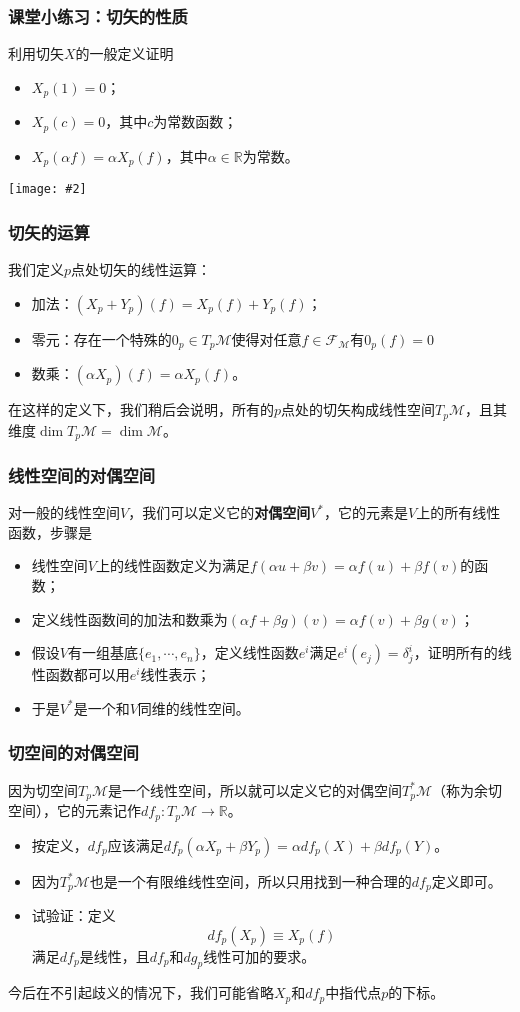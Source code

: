 \documentclass[CJK]{beamer}
\newcommand{\field}{\mathscr{F}}
\newcommand{\reals}{\mathbb{R}}
\newcommand{\mani}{\mathcal{M}}
\newcommand{\cpic}[2]{
\begin{center}
\texttt{[image: \#2]}
\end{center}
}
\begin{document}
\begin{frame}
\frametitle{\bch 课堂小练习：切矢的性质 \ech}
\bch
利用切矢$X$的一般定义证明
\begin{itemize}
\item $X_p(1) = 0$；
\item $X_p(c) = 0$，其中$c$为常数函数；
\item $X_p(\alpha f) = \alpha X_p(f)$，其中$\alpha \in \reals$为常数。
\end{itemize}
\cpic{0.2}{sad}

\ech
\end{frame}

\begin{frame}
\frametitle{\bch 切矢的运算 \ech}
\bch
我们定义$p$点处切矢的线性运算：
\begin{itemize}
\item 加法：$(X_p+Y_p)(f) = X_p(f) + Y_p(f)$；
\item 零元：存在一个特殊的$0_p\in T_p\mani$使得对任意$f\in \field_\mani$有$0_p (f) = 0$
\item 数乘：$(\alpha X_p)( f) = \alpha X_p(f)$。
\end{itemize}
在这样的定义下，我们稍后会说明，所有的$p$点处的切矢构成线性空间$T_p \mani$，且其维度$\dim T_p \mani = \dim \mani$。
\ech
\end{frame}

\begin{frame}
\frametitle{\bch 线性空间的对偶空间 \ech}
\bch
对一般的线性空间$V$，我们可以定义它的{\bf \color{purple}对偶空间}$V^*$，它的元素是$V$上的所有线性函数，步骤是
\begin{itemize}
\item 线性空间$V$上的线性函数定义为满足$f(\alpha u + \beta v)= \alpha f(u) + \beta f(v)$的函数；
\item 定义线性函数间的加法和数乘为$(\alpha f + \beta g) (v) = \alpha f(v) + \beta g(v)$；
\item 假设$V$有一组基底$\{e_1,\cdots,e_n\}$，定义线性函数$e^i$满足$e^i(e_j) = \delta^i_j$，证明所有的线性函数都可以用$e^i$线性表示；
\item 于是$V^*$是一个和$V$同维的线性空间。
\end{itemize}
\ech
\end{frame}


\begin{frame}
\frametitle{\bch 切空间的对偶空间 \ech}
\bch
因为切空间$T_p\mani$是一个线性空间，所以就可以定义它的对偶空间$T_p^*\mani$（称为余切空间），它的元素记作$df_p: T_p \mani \to \reals$。
\begin{itemize}
\item 按定义，$df_p$应该满足$df_p(\alpha X_p + \beta Y_p) = \alpha df_p(X) + \beta df_p(Y)$。
\item 因为$T_p^*\mani$也是一个有限维线性空间，所以只用找到一种合理的$df_p$定义即可。
\item 试验证：定义{\color{blue}$$df_p(X_p) \equiv X_p(f)$$}满足$df_p$是线性，且$df_p$和$dg_p$线性可加的要求。
\end{itemize}
今后在不引起歧义的情况下，我们可能省略$X_p$和$df_p$中指代点$p$的下标。
\ech
\end{frame}
\end{document}

